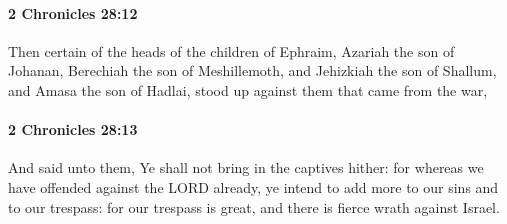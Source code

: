 		\paragraph{2 Chronicles 28:12} %
			\label{2CHRONICLES-28-12}

			Then certain of the heads of the children of Ephraim, Azariah the son of Johanan, Berechiah the son of Meshillemoth, and Jehizkiah the son of Shallum, and Amasa the son of Hadlai, stood up against them that came from the war,


		\paragraph{2 Chronicles 28:13} %
			\label{2CHRONICLES-28-13}

			And said unto them, Ye shall not bring in the captives hither: for whereas we have offended against the LORD already, ye intend to add more to our sins and to our trespass: for our trespass is great, and there is fierce wrath against Israel.

